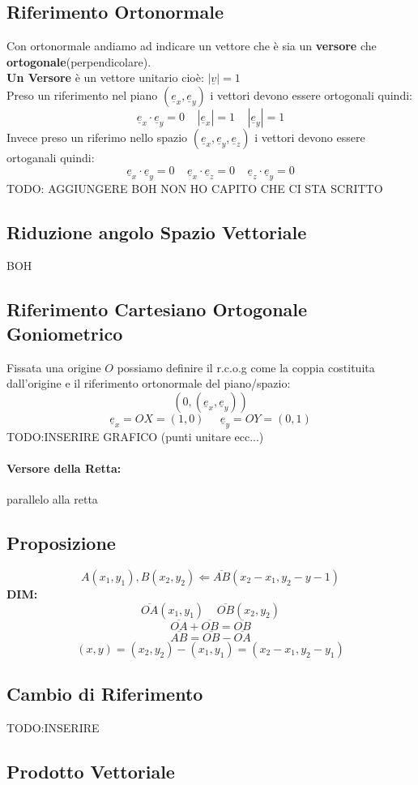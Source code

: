\subsection{Riferimento Ortonormale}
Con ortonormale andiamo ad indicare un vettore che è sia un \textbf{versore} che \textbf{ortogonale}(perpendicolare).\\
\textbf{Un Versore} è un vettore unitario cioè: $|\underline{v}| = 1$ \\
Preso un riferimento nel piano $(\underline{e}_x, \underline{e}_y)$ i vettori devono essere ortogonali quindi:
$$ \underline{e}_x \cdot \underline{e}_y = 0 \;\;\;\; |\underline{e}_x|=1 \;\;\;\; |\underline{e}_y|=1 $$ 
Invece preso un riferimo nello spazio $(\underline{e}_x,\underline{e}_y,\underline{e}_z)$ i vettori devono essere ortoganali quindi:
$$ \underline{e}_x \cdot \underline{e}_y = 0 \;\;\;\; \underline{e}_x \cdot \underline{e}_z = 0 \;\;\;\; \underline{e}_z \cdot \underline{e}_y = 0 $$
TODO: AGGIUNGERE BOH NON HO CAPITO CHE CI STA SCRITTO

\subsection{Riduzione angolo Spazio Vettoriale}
BOH

\subsection{Riferimento Cartesiano Ortogonale Goniometrico}
Fissata una origine $O$ possiamo definire il r.c.o.g come la coppia costituita dall'origine e il riferimento ortonormale del piano/spazio:
$$ (0,(\underline{e}_x,\underline{e}_y)) $$
$$ \underline{e}_x = OX = (1,0) \;\;\;\;\; \underline{e}_y = OY = (0,1) $$
TODO:INSERIRE GRAFICO (punti unitare ecc...)

\paragraph{Versore della Retta:} parallelo alla retta

\subsection{Proposizione}
$$ A(x_1,y_1), B(x_2,y_2) \Leftarrow \overline{AB}(x_2-x_1, y_2-y-1) $$
\textbf{DIM:}
$$ \overline{OA}(x_1,y_1) \;\;\;\; \overline{OB}(x_2,y_2) $$
$$ \overline{OA}+\overline{OB} = \overline{OB}$$
$$ \overline{AB} = \overline{OB} - \overline{OA} $$
$$ (x,y) = (x_2,y_2)-(x_1,y_1) = (x_2-x_1, y_2-y_1) $$

\subsection{Cambio di Riferimento}
TODO:INSERIRE

\subsection{Prodotto Vettoriale}







